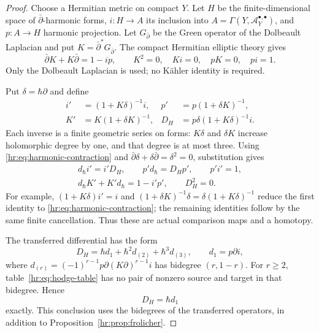 \begin{proof}
Choose a Hermitian metric on compact $Y$.
Let $H$ be the finite-dimensional space of
$\bar\partial$-harmonic forms, $i:H\to A$ its inclusion
into $A=\Gamma(Y,\mathcal A_Y^{\bullet,\bullet})$,
and $p:A\to H$ harmonic projection.
Let $G_{\bar\partial}$ be the Green operator of the
Dolbeault Laplacian and put
$K=\bar\partial^*G_{\bar\partial}$.
The compact Hermitian elliptic theory
\cite[Part~I, Theorems~3.15 and 7.1--7.3]{DemaillyHodge}
gives
\begin{equation}\label{hr:eq:harmonic-contraction}
 \bar\partial K+K\bar\partial=1-ip,\qquad
 K^2=0,\quad Ki=0,\quad pK=0,\quad pi=1.
\end{equation}
Only the Dolbeault Laplacian is used; no K\"ahler
identity is required.

Put $\delta=\hbar\partial$ and define
\begin{equation}\label{hr:eq:perturbation}
 \begin{aligned}
 i'&=(1+K\delta)^{-1}i,&
 p'&=p(1+\delta K)^{-1},\\
 K'&=K(1+\delta K)^{-1},&
 D_H&=p\delta(1+K\delta)^{-1}i.
 \end{aligned}
\end{equation}
Each inverse is a finite geometric series on forms:
$K\delta$ and $\delta K$ increase holomorphic degree
by one, and that degree is at most three.
Using \eqref{hr:eq:harmonic-contraction} and
$\bar\partial\delta+\delta\bar\partial=\delta^2=0$,
substitution gives
\begin{equation}\label{hr:eq:perturbed-identities}
 \begin{gathered}
 d_\hbar i'=i'D_H,\qquad p'd_\hbar=D_Hp',\qquad p'i'=1,\\
 d_\hbar K'+K'd_\hbar=1-i'p',\qquad D_H^2=0.
 \end{gathered}
\end{equation}
For example, $(1+K\delta)i'=i$ and
$(1+\delta K)^{-1}\delta
=\delta(1+K\delta)^{-1}$ reduce the first identity
to \eqref{hr:eq:harmonic-contraction}; the remaining
identities follow by the same finite cancellation.
Thus these are actual comparison maps and a homotopy.

The transferred differential has the form
\[
 D_H=\hbar d_1+\hbar^2d_{(2)}+\hbar^3d_{(3)},\qquad
 d_1=p\partial i,
\]
where
$d_{(r)}=(-1)^{r-1}p\partial(K\partial)^{r-1}i$
has bidegree $(r,1-r)$.
For $r\ge2$, table~\eqref{hr:eq:hodge-table} has no
pair of nonzero source and target in that bidegree.
Hence
\begin{equation}\label{hr:eq:transferred-differential}
 D_H=\hbar d_1
\end{equation}
exactly. This conclusion uses the bidegrees of the
transferred operators, in addition to
Proposition~\ref{hr:prop:frolicher}.


\end{proof}
